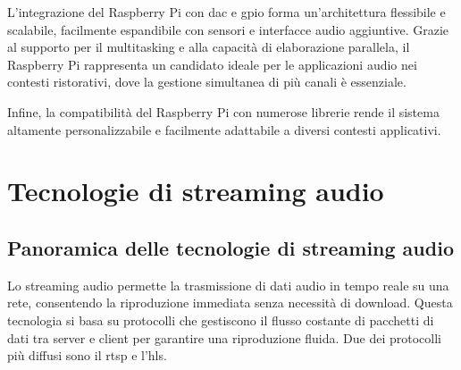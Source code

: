 L’integrazione del Raspberry Pi con \gls{dac} e \gls{gpio} forma un’architettura flessibile e scalabile, facilmente espandibile con sensori e interfacce audio aggiuntive. Grazie al supporto per il multitasking e alla capacità di elaborazione parallela, il Raspberry Pi rappresenta un candidato ideale per le applicazioni audio nei contesti ristorativi, dove la gestione simultanea di più canali è essenziale. \cite{raspberrypi_doc}

Infine, la compatibilità del Raspberry Pi con numerose librerie rende il sistema altamente personalizzabile e facilmente adattabile a diversi contesti applicativi.

\section{Tecnologie di streaming audio}

\subsection{Panoramica delle tecnologie di streaming audio}
\noindent

Lo streaming audio permette la trasmissione di dati audio in tempo reale su una rete, consentendo la riproduzione immediata senza necessità di download. Questa tecnologia si basa su protocolli che gestiscono il flusso costante di pacchetti di dati tra server e client  per garantire una riproduzione fluida. Due dei protocolli più diffusi sono il \gls{rtsp} e l'\gls{hls}. 

